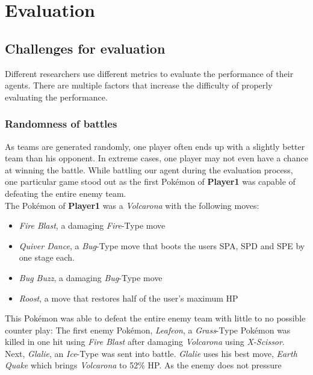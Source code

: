 
\chapter{Evaluation}
\label{ch:evaluation}

\section{Challenges for evaluation}
\label{sec:eval-challenges}
Different researchers use different metrics to evaluate the performance of their agents. 
There are multiple factors that increase the difficulty of properly evaluating the performance.

\subsection{Randomness of battles}
\label{sec:eval-challenges-randomness}
As teams are generated randomly, one player often ends up with a slightly better team than his opponent.
In extreme cases, one player may not even have a chance at winning the battle. While battling
our agent during the evaluation process, one particular game stood out as the first Pokémon of 
\textbf{Player1} was capable of defeating the entire enemy team. \\
The Pokémon of \textbf{Player1} was a \textit{Volcarona} with the following moves:
\begin{itemize}
    \item \textit{Fire Blast}, a damaging \textit{Fire}-Type move
    \item \textit{Quiver Dance}, a \textit{Bug}-Type move that boots the users \ac{SPA}, \ac{SPD} and 
    \ac{SPE} by one stage each.
    \item \textit{Bug Buzz}, a damaging \textit{Bug}-Type move
    \item \textit{Roost}, a move that restores half of the user's maximum \ac{HP}
\end{itemize}
This Pokémon was able to defeat the entire enemy team with little to no possible counter play:
The first enemy Pokémon, \textit{Leafeon}, a \textit{Grass}-Type Pokémon was killed in one hit using
\textit{Fire Blast} after damaging \textit{Volcarona} using \textit{X-Scissor}. \\
Next, \textit{Glalie}, an \textit{Ice}-Type was sent into battle. \textit{Glalie} uses his best move,
\textit{Earth Quake} which brings \textit{Volcarona} to 52\% \ac{HP}. As the enemy does not pressure
